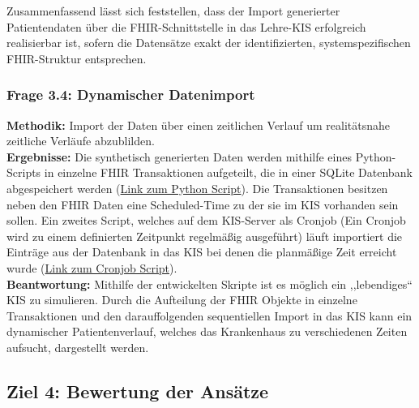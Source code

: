 \begin{description}[style=nextline, font=\bfseries]
    \item[Beantwortung] 
    Zusammenfassend lässt sich feststellen, dass der Import generierter Patientendaten über die FHIR-Schnittstelle in das Lehre-KIS erfolgreich realisierbar ist, sofern die Datensätze exakt der identifizierten, systemspezifischen FHIR-Struktur entsprechen.

\end{description}
\subsubsection{Frage 3.4: Dynamischer Datenimport}
\textbf{Methodik:} Import der Daten über einen zeitlichen Verlauf um realitätsnahe zeitliche Verläufe abzublilden. \\
\textbf{Ergebnisse:} Die synthetisch generierten Daten werden mithilfe eines Python-Scripts in einzelne FHIR Transaktionen aufgeteilt, die in einer SQLite Datenbank abgespeichert werden (\href{https://github.com/robinhefner/Research-Project/blob/e212d9b0d35173136eb8706f443504a473cea27e/lebendigePatientendaten/prepare_patients.py}{Link zum Python Script}). Die Transaktionen besitzen neben den FHIR Daten eine Scheduled-Time zu der sie im KIS vorhanden sein sollen. Ein zweites Script, welches auf dem KIS-Server als Cronjob (Ein Cronjob wird zu einem definierten Zeitpunkt regelmäßig ausgeführt) läuft importiert die Einträge aus der Datenbank in das KIS bei denen die planmäßige Zeit erreicht wurde (\href{https://github.com/robinhefner/Research-Project/blob/e212d9b0d35173136eb8706f443504a473cea27e/lebendigePatientendaten/cron_injector.py}{Link zum Cronjob Script}).\\
\textbf{Beantwortung:}
Mithilfe der entwickelten Skripte ist es möglich ein ,,lebendiges`` KIS zu simulieren. Durch die Aufteilung der FHIR Objekte in einzelne Transaktionen und den darauffolgenden sequentiellen Import in das KIS kann ein dynamischer Patientenverlauf, welches das Krankenhaus zu verschiedenen Zeiten aufsucht, dargestellt werden.   


\subsection{Ziel 4: Bewertung der Ansätze}
